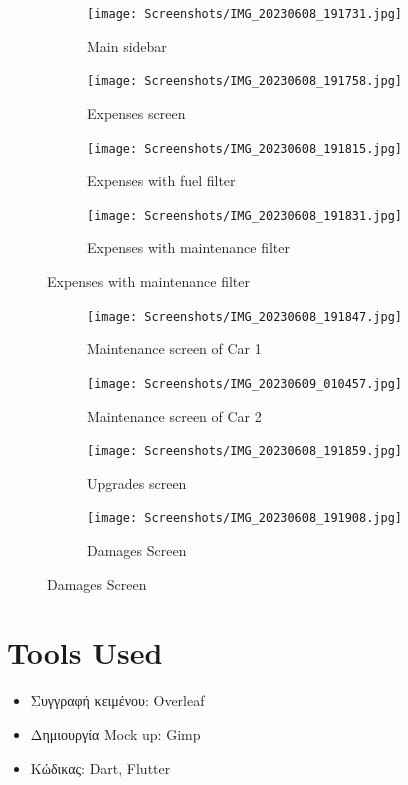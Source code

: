 \documentclass[11pt]{scrartcl} %
\begin{document}
\begin{figure}[!htb]
\begin{subfigure}{.5\textwidth}
  \centering
  \texttt{[image: Screenshots/IMG\_20230608\_191731.jpg]}
  \caption{Main sidebar}
  \label{fig:sfig1}
\end{subfigure}%
\begin{subfigure}{.5\textwidth}
  \centering
  \texttt{[image: Screenshots/IMG\_20230608\_191758.jpg]}
  \caption{Expenses screen}
  \label{fig:sfig2}
\end{subfigure}
\label{fig:fig}
\par\bigskip %
\begin{subfigure}{.5\textwidth}
  \centering
  \texttt{[image: Screenshots/IMG\_20230608\_191815.jpg]}
  \caption{Expenses with fuel filter}
  \label{fig:sfig3}
\end{subfigure}
\label{fig:fig}
\begin{subfigure}{.5\textwidth}
  \centering
  \texttt{[image: Screenshots/IMG\_20230608\_191831.jpg]}
  \caption{Expenses with maintenance filter}
  \label{fig:sfig4}
\end{subfigure}
\label{fig:fig}
\end{figure}

\begin{figure}[!htb] \ContinuedFloat
\begin{subfigure}{.5\textwidth}
  \centering
  \texttt{[image: Screenshots/IMG\_20230608\_191847.jpg]}
  \caption{Maintenance screen of Car 1}
  \label{fig:sfig1}
\end{subfigure}%
\begin{subfigure}{.5\textwidth}
  \centering
  \texttt{[image: Screenshots/IMG\_20230609\_010457.jpg]}
  \caption{Maintenance screen of Car 2}
  \label{fig:sfig2}
\end{subfigure}
\label{fig:fig}
\par\bigskip %
\begin{subfigure}{.5\textwidth}
  \centering
  \texttt{[image: Screenshots/IMG\_20230608\_191859.jpg]}
  \caption{Upgrades screen}
  \label{fig:sfig3}
\end{subfigure}
\label{fig:fig}
\begin{subfigure}{.5\textwidth}
  \centering
  \texttt{[image: Screenshots/IMG\_20230608\_191908.jpg]}
  \caption{Damages Screen}
  \label{fig:sfig4}
\end{subfigure}
\label{fig:fig}
\end{figure}

\clearpage
\section{Tools Used}
\begin{itemize}
    \item Συγγραφή κειμένου: Overleaf
    \item Δημιουργία Mock up: Gimp
    \item Κώδικας: Dart, Flutter
\end{itemize}


\end{document}
